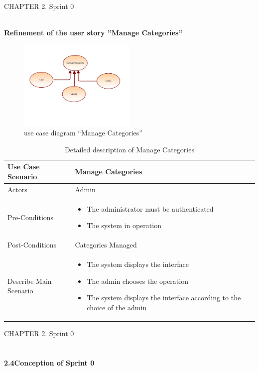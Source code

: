 \documentclass{article}
\begin{document}
{{\newpage
\noindent
CHAPTER 2.  Sprint 0 \\
\underline{\hspace{\textwidth}} \vspace{0.2cm}\\
{\large \textbf{Refinement of the user story ”Manage Categories”}
\begin{figure}[htbp]
    \centering
    \includegraphics[width=0.5\textwidth]{Manage}
    \caption{use case diagram “Manage Categories”}
    \label{fig:design2}
\end{figure}
\begin{table}[h]
    \centering
    \begin{tabularx}{\textwidth}{X|X}
        \toprule
        Use Case Scenario & Manage Categories \\
        \midrule
        Actors & Admin \\
        \midrule
        Pre-Conditions & \begin{itemize}[label=$\bullet$]
            \item The administrator must be authenticated
            \item The system in operation
        \end{itemize} \\
        \midrule
        Post-Conditions & Categories Managed  \\
        \midrule
        Describe Main Scenario &  \begin{itemize}[label=$\bullet$]
            \item The system displays the interface
            \item The admin chooses the operation
            \item The system displays the interface according to the choice of the admin
        \end{itemize} \\
        \bottomrule
    \end{tabularx}
    \caption{Detailed description of Manage Categories}
    \label{tab:actors_roles}
\end{table}
\newpage
\noindent
CHAPTER 2.  Sprint 0 \\
\underline{\hspace{\textwidth}} \vspace{0.2cm}\\
\\{\Large \textbf{2.4\hspace{1em}Conception of Sprint 0}}\vspace{0.2cm}

}}}
\end{document}
